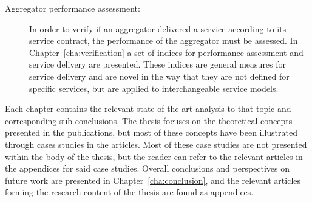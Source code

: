 \begin{description}
	\item[Aggregator performance assessment:] In order to verify if an aggregator delivered a service according to its service contract, the performance of the aggregator must be assessed. In Chapter~\ref{cha:verification} a set of indices for performance assessment and service delivery are presented. These indices are general measures for service delivery and are novel in the way that they are not defined for specific services, but are applied to interchangeable service models.
\end{description}

Each chapter contains the relevant state-of-the-art analysis to that topic and corresponding sub-conclusions. The thesis focuses on the theoretical concepts presented in the publications, but most of these concepts have been illustrated through cases studies in the articles. Most of these case studies are not presented within the body of the thesis, but the reader can refer to the relevant articles in the appendices for said case studies. Overall conclusions and perspectives on future work are presented in Chapter~\ref{cha:conclusion}, and the relevant articles forming the research content of the thesis are found as appendices. 




